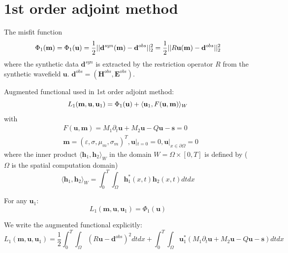 \documentclass[pdftex,a4paper,parskip,listof=totoc,bibliography=totoc,onehalfspacing,12pt]{scrreprt}
\begin{document}
\section{1st order adjoint method}
\par The misfit function
\begin{equation}
 \Phi_1(\mathbf{m}) = \Phi_1(\mathbf{u}) = \frac{1}{2} || \mathbf{d}^{syn}(\mathbf{m}) - \mathbf{d}^{obs} ||_2^2 = \frac{1}{2} || R\mathbf{u}(\mathbf{m}) - \mathbf{d}^{obs} ||_2^2 \\
\end{equation}
where the synthetic data $\mathbf{d}^{syn}$ is extracted by the restriction operator $R$ from the synthetic wavefield $\mathbf{u}$. $\mathbf{d}^{obs}=(\mathbf{H}^{obs}, \mathbf{E}^{obs})$. \\
\par Augmented functional used in 1st order adjoint method:
\begin{equation}
 L_1(\mathbf{m}, \mathbf{u},\mathbf{u}_{1}) = \Phi_1(\mathbf{u}) + \langle \mathbf{u}_{1}, F(\mathbf{u},\mathbf{m}) \rangle_W \\
\end{equation}
with
\begin{equation}
\begin{split}
\label{eqn:initialCondition1}
 & F(\mathbf{u},\mathbf{m}) = M_1 \partial_{t} \mathbf{u} + M_2 \mathbf{u} - Q\mathbf{u} - \mathbf{s} = 0 \\
 & \mathbf{m} = (\varepsilon, \sigma, \mu_m, \sigma_m)^T, \mathbf{u}|_{t=0} = 0, \mathbf{u}|_{x\in \partial \Omega} = 0
 \end{split}
\end{equation}
where the inner product $\langle \mathbf{h}_1, \mathbf{h}_2 \rangle_W$ in the domain $W=\Omega \times [0, T]$ is defined by ($\Omega$ is the spatial computation domain)\\
\begin{equation}
 \langle \mathbf{h}_1, \mathbf{h}_2 \rangle_W = \int_0^T \int_\Omega \mathbf{h}_1^{*}(x,t) \mathbf{h}_2(x,t) dt dx
\end{equation}
\par For any $\mathbf{u}_{1}$:
\begin{equation}
 L_1(\mathbf{m}, \mathbf{u},\mathbf{u}_{1}) = \Phi_1(\mathbf{u}) 
\end{equation}
\par We write the augmented functional explicitly:
\begin{equation}
\label{eqn:AugmentFunctional1}
 L_1(\mathbf{m}, \mathbf{u},\mathbf{u}_{1}) = \frac{1}{2} \int_0^T \int_\Omega (R\mathbf{u} - \mathbf{d}^{obs})^2 dt dx + \int_0^T \int_\Omega \mathbf{u}_{1}^{*} (M_1 \partial_{t} \mathbf{u} + M_2 \mathbf{u} - Q \mathbf{u} - \mathbf{s})  dt dx
\end{equation}
\end{document}
